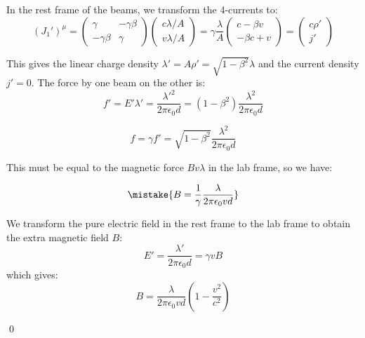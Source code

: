 \documentclass[12pt]{article}
\begin{document}
In the rest frame of the beams, we transform the 4-currents to:
\begin{equation}
    (J_{1}')^{\mu} =
    \begin{pmatrix}
        \gamma        & -\gamma \beta \\
        -\gamma \beta & \gamma
    \end{pmatrix}
    \begin{pmatrix}
        c\lambda/A \\
        v\lambda/A
    \end{pmatrix}
    =
    \gamma \frac{\lambda}{A}
    \begin{pmatrix}
        c - \beta v \\
        -\beta c + v
    \end{pmatrix}
    =
    \begin{pmatrix}
        c \rho' \\
        j'
    \end{pmatrix}
\end{equation}

This gives the linear charge density $\lambda' = A \rho' = \sqrt{1 - \beta^{2}} \lambda$ and the current density $j' = 0$. The force by one beam on the other is:
\begin{equation}
    f' = E' \lambda' = \frac{\lambda'^{2}}{2\pi\epsilon_{0}d} = (1 - \beta^{2}) \frac{\lambda^{2}}{2\pi\epsilon_{0}d}
\end{equation}

\begin{equation}
    f = \gamma f' = \sqrt{1 - \beta^{2}} \frac{\lambda^{2}}{2\pi\epsilon_{0}d}
\end{equation}

This must be equal to the magnetic force $Bv\lambda$ in the lab frame, so we have:

\begin{equation}
    \mistake{B = \frac{1}{\gamma} \frac{\lambda}{2\pi\epsilon_{0}vd}}
\end{equation}

\begin{correction}
    We transform the pure electric field in the rest frame to the lab frame to obtain the extra magnetic field $B$:
    \begin{equation}
        E' = \frac{\lambda'}{2\pi\epsilon_{0}d} = \gamma v B
    \end{equation}
    which gives:
    \begin{equation}
        B = \frac{\lambda}{2\pi\epsilon_{0}vd} \left( 1 - \frac{v^{2}}{c^{2}} \right)
    \end{equation}
\end{correction}
\qed
\end{document}

